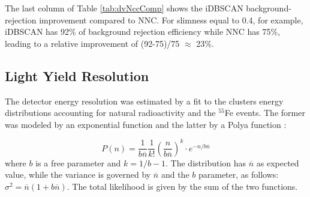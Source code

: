 \documentclass[a4paper,11pt]{article}
\begin{document}
The last column of Table \ref{tab:dvNccComp} shows the iDBSCAN background-rejection improvement compared to NNC. 
For slimness equal to 0.4, for example, iDBSCAN has 92\% of background rejection efficiency while NNC has 75\%, leading to a relative improvement of (92-75)/75 $\approx$ 23\%.



\subsection{Light Yield Resolution}\label{subsec:detres}



The detector energy resolution was estimated by a fit to the clusters energy distributions accounting for natural radioactivity and the $^{55}$Fe events. The former was modeled by an exponential function and the latter by a Polya function \cite{bib:rolandiblum}:

\begin{equation}
   P(n)=\frac{1}{b\overline{n}}\frac{1}{k!}\left(\frac{n}{b\overline{n}}\right)^k \cdot e^{-n/b\overline{n}}
\label{fun:polya}
\end{equation}
where $b$ is a free parameter and $k=1/b-1$. The distribution has $\overline{n}$ as expected value, while the variance is governed by $\overline{n}$ and the $b$ parameter, as follows: $\sigma^2=\overline{n}(1+b\overline{n})$. The total likelihood is given by the sum of the two functions.
\end{document}
